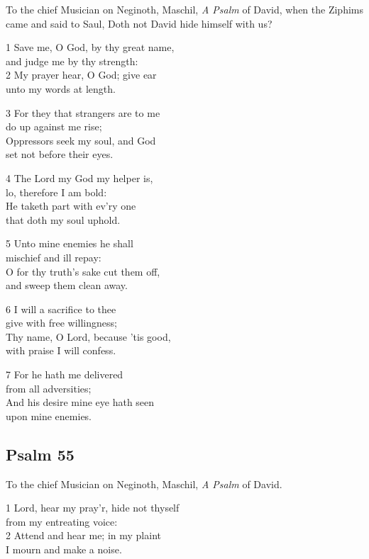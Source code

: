 To the chief Musician on Neginoth, Maschil, \emph{A Psalm} of David, when the Ziphims came and said to Saul, Doth not David hide himself with us?

1 Save me, O God, by thy great name,\\
and judge me by thy strength:\\
2 My prayer hear, O God; give ear\\
unto my words at length.

3 For they that strangers are to me\\
do up against me rise;\\
Oppressors seek my soul, and God\\
set not before their eyes.

4 The Lord my God my helper is,\\
lo, therefore I am bold:\\
He taketh part with ev’ry one\\
that doth my soul uphold.

5 Unto mine enemies he shall\\
mischief and ill repay:\\
O for thy truth’s sake cut them off,\\
and sweep them clean away.

6 I will a sacrifice to thee\\
give with free willingness;\\
Thy name, O Lord, because ’tis good,\\
with praise I will confess.

7 For he hath me delivered\\
from all adversities;\\
And his desire mine eye hath seen\\
upon mine enemies.

\begin{center}
\quad{}\quad{}
\end{center}

\subsection*{Psalm 55}

To the chief Musician on Neginoth, Maschil,
\emph{A Psalm} of David.

1 Lord, hear my pray’r, hide not thyself\\
from my entreating voice:\\
2 Attend and hear me; in my plaint\\
I mourn and make a noise.

